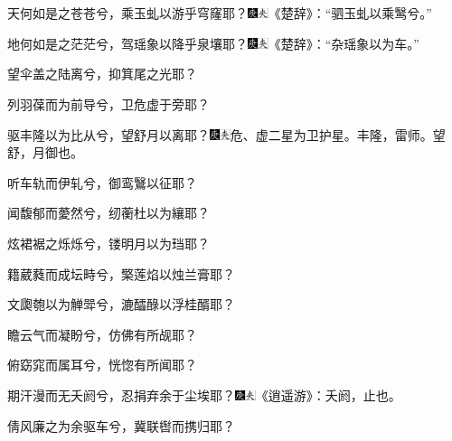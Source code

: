 \\
\\
\indent
天何如是之苍苍兮，乘玉虬以游乎穹窿耶？{{\includegraphics[width=3mm]{../Images/00004}\includegraphics[width=3mm]{../Images/00012}\footnotesize \kaishu 《楚辞》：“驷玉虬以乘鹥兮。”}}

地何如是之茫茫兮，驾瑶象以降乎泉壤耶？{\includegraphics[width=3mm]{../Images/00004}\includegraphics[width=3mm]{../Images/00012}\footnotesize \kaishu 《楚辞》：“杂瑶象以为车。”}

望伞盖之陆离兮，抑箕尾之光耶？

列羽葆而为前导兮，卫危虚于旁耶？

驱丰隆以为比从兮，望舒月以离耶？{\includegraphics[width=3mm]{../Images/00004}\includegraphics[width=3mm]{../Images/00012}\footnotesize \kaishu 危、虚二星为卫护星。丰隆，雷师。望舒，月御也。}

听车轨而伊轧兮，御鸾鷖以征耶？

闻馥郁而薆然兮，纫蘅杜以为纕耶？

炫裙裾之烁烁兮，镂明月以为珰耶？

籍葳蕤而成坛畤兮，檠莲焰以烛兰膏耶？

文瓟匏以为觯斝兮，漉醽醁以浮桂醑耶？

瞻云气而凝盼兮，仿佛有所觇耶？

俯窈窕而属耳兮，恍惚有所闻耶？

期汗漫而无夭阏兮，忍捐弃余于尘埃耶？{\includegraphics[width=3mm]{../Images/00004}\includegraphics[width=3mm]{../Images/00012}\footnotesize \kaishu 《逍遥游》：夭阏，止也。}

倩风廉之为余驱车兮，冀联辔而携归耶？

